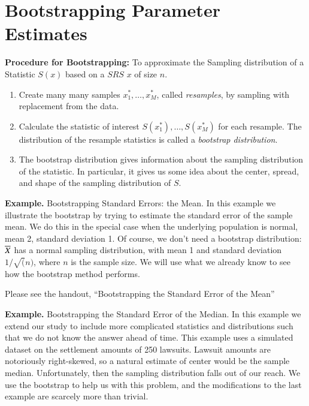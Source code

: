\documentclass[captions=tableheading]{scrbook}
\begin{document}
\section{Bootstrapping Parameter Estimates}
\label{sec-4_2}


\textbf{Procedure for Bootstrapping:} To approximate the Sampling distribution of a Statistic $S(x)$ based on a $SRS$ $x$ of size $n$.


\begin{enumerate}
\item Create many many samples $x_{1}^{\ast},\ldots,x_{M}^{\ast}$, called \emph{resamples}, by sampling with replacement from the data.
\item Calculate the statistic of interest $S(x_{1}^{\ast}),\ldots,S(x_{M}^{\ast})$ for each resample. The distribution of the resample statistics is called a \emph{bootstrap distribution}.
\item The bootstrap distribution gives information about the sampling distribution of the statistic. In particular, it gives us some idea about the center, spread, and shape of the sampling distribution of $S$.
\end{enumerate}

\textbf{Example.} Bootstrapping Standard Errors: the Mean.  In this example we illustrate the bootstrap by trying to estimate the standard error of the sample mean. We do this in the special case when the underlying population is normal, mean 2, standard deviation 1. Of course, we don't need a bootstrap distribution: $\overline{X}$ has a normal sampling distribution, with mean 1 and standard deviation $1/\sqrt{(}n)$, where $n$ is the sample size. We will use what we already know to see how the bootstrap method performs.

 

Please see the handout, ``Bootstrapping the Standard Error of the Mean''  


 
\textbf{Example.} Bootstrapping the Standard Error of the Median. In this example we extend our study to include more complicated statistics and distributions such that we do not know the answer ahead of time. This example uses a simulated dataset on the settlement amounts of 250 lawsuits. Lawsuit amounts are notoriously right-skewed, so a natural estimate of center would be the sample median. Unfortunately, then the sampling distribution falls out of our reach. We use the bootstrap to help us with this problem, and the modifications to the last example are scarcely more than trivial.
\end{document}
